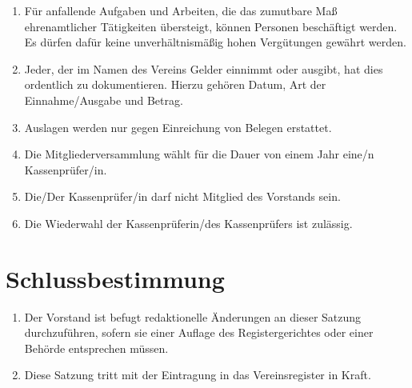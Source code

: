 \documentclass[12pt,a4paper,draft]{article}
\begin{document}
\begin{enumerate}
\item Für anfallende Aufgaben und Arbeiten, die das zumutbare Maß 
ehrenamtlicher Tätigkeiten übersteigt, können Personen beschäftigt werden. Es 
dürfen dafür keine unverhältnismäßig hohen Vergütungen gewährt werden.

\item Jeder, der im Namen des Vereins Gelder einnimmt oder ausgibt, hat dies 
ordentlich zu dokumentieren. Hierzu gehören Datum, Art der Einnahme/Ausgabe und 
Betrag.

\item Auslagen werden nur gegen Einreichung von Belegen erstattet.

\item Die Mitgliederversammlung wählt für die Dauer von einem Jahr eine/n 
Kassenprüfer/in.

\item Die/Der Kassenprüfer/in darf nicht Mitglied des Vorstands sein.

\item Die Wiederwahl der Kassenprüferin/des Kassenprüfers ist zulässig.
\end{enumerate}

\section{Schlussbestimmung}
\begin{enumerate}
\item Der Vorstand ist befugt redaktionelle Änderungen an dieser Satzung 
durchzuführen, sofern sie einer Auflage des Registergerichtes oder einer 
Behörde entsprechen müssen.

\item Diese Satzung tritt mit der Eintragung in das Vereinsregister in Kraft.
\end{enumerate}

\end{document}
